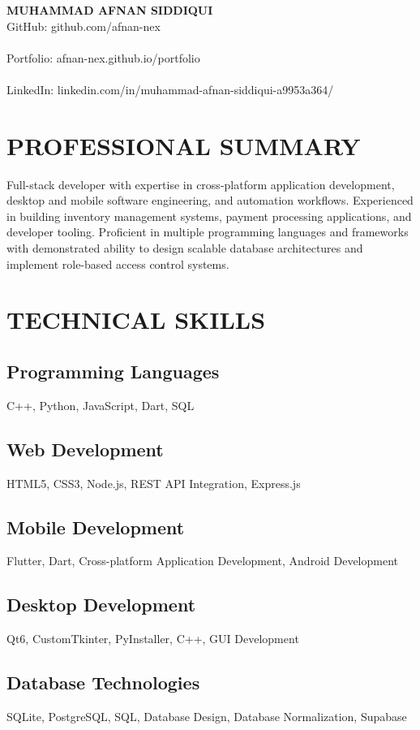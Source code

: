 \documentclass[11pt,letterpaper]{article}
\newcommand{\header}[4]{
  \begin{center}
    {\Large\bfseries #1} \\
    \vspace{0.25em}
    \small #2 \\ \textbar{} \\ #3 \\ \textbar{} \\ #4
  \end{center}
  \vspace{0.5em}
}
\begin{document}
\header
  {MUHAMMAD AFNAN SIDDIQUI}
  {GitHub: github.com/afnan-nex}
  {Portfolio: afnan-nex.github.io/portfolio}
  {LinkedIn: linkedin.com/in/muhammad-afnan-siddiqui-a9953a364/}

\section*{PROFESSIONAL SUMMARY}
Full-stack developer with expertise in cross-platform application development, desktop and mobile software engineering, and automation workflows. Experienced in building inventory management systems, payment processing applications, and developer tooling. Proficient in multiple programming languages and frameworks with demonstrated ability to design scalable database architectures and implement role-based access control systems.

\section*{TECHNICAL SKILLS}

\subsection*{Programming Languages}
C++, Python, JavaScript, Dart, SQL

\subsection*{Web Development}
HTML5, CSS3, Node.js, REST API Integration, Express.js

\subsection*{Mobile Development}
Flutter, Dart, Cross-platform Application Development, Android Development

\subsection*{Desktop Development}
Qt6, CustomTkinter, PyInstaller, C++, GUI Development

\subsection*{Database Technologies}
SQLite, PostgreSQL, SQL, Database Design, Database Normalization, Supabase
\end{document}
